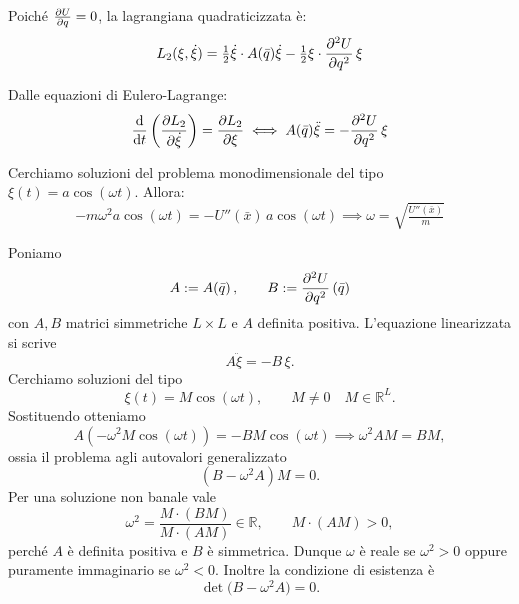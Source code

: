 Poiché $\pdv{U}{q}(\bar{q})=0$, la lagrangiana quadraticizzata è:
\begin{equation}
    L_2(\xi,\dot{\xi}) = \tfrac{1}{2}\dot{\xi}\cdot A(\bar{q})\dot{\xi} 
    - \tfrac{1}{2}\xi\cdot \pdv[2]{U}{q}(\bar{q})\,\xi
\end{equation}

Dalle equazioni di Eulero-Lagrange:
\begin{equation}
    \dv{t}\left( \pdv{L_2}{\dot{\xi}} \right) = \pdv{L_2}{\xi}
    \iff
    A(\bar{q})\ddot{\xi} = - \pdv[2]{U}{q}(\bar{q})\,\xi
\end{equation}

Cerchiamo soluzioni del problema monodimensionale del tipo $\xi(t)=a\cos(\omega t)$. Allora:
\begin{equation}
    -m\omega^2 a\cos(\omega t) = -U''(\bar{x})\,a\cos(\omega t)
    \implies \omega = \sqrt{\tfrac{U''(\bar{x})}{m}}
\end{equation}

Poniamo
\begin{equation}
    A := A(\bar{q})\,, \qquad B := \pdv[2]{U}{q}\left(\bar{q}\right)
\end{equation}
con $A,B$ matrici simmetriche $L\times L$ e $A$ definita positiva. L'equazione linearizzata si scrive
\begin{equation}
    A\ddot{\xi} = - B\,\xi.
\end{equation}
Cerchiamo soluzioni del tipo
\begin{equation}
    \xi(t) = M\cos(\omega t), \qquad M\neq 0\quad M \in \mathbb{R}^L.
\end{equation}
Sostituendo otteniamo
\begin{equation}
    A(-\omega^2 M\cos(\omega t)) = - B M\cos(\omega t) \implies \omega^2 A M = B M,
\end{equation}
ossia il problema agli autovalori generalizzato
\begin{equation}
    (B - \omega^2 A) M = 0.
\end{equation}
Per una soluzione non banale vale
\begin{equation}
    \omega^2 = \frac{M\cdot (B M)}{M\cdot (A M)} \in \mathbb{R}, \qquad M\cdot (A M) > 0,
\end{equation}
perché $A$ è definita positiva e $B$ è simmetrica. Dunque $\omega$ è reale se $\omega^2>0$ oppure puramente immaginario se $\omega^2<0$.
Inoltre la condizione di esistenza è
\begin{equation}
    \det\big( B - \omega^2 A \big) = 0.
\end{equation}

